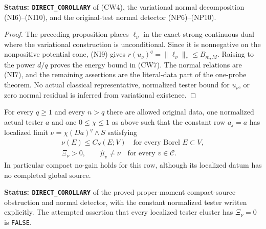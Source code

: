 \noindent\textbf{Status: \texttt{DIRECT\_COROLLARY}} of
(CW4), the variational normal decomposition (NI6)--(NI10),
and the original-test normal detector (NP6)--(NP10).

\begin{proof}
The preceding proposition places $\ell_\nu$ in the exact
strong-continuous dual where the variational construction is
unconditional. Since it is nonnegative on the nonpositive
potential cone, (NI9) gives
$r(u_\nu)^q=\|\ell_\nu\|_*\leq B_{m,M}$.
Raising to the power $d/q$ proves the energy bound in (CW7).
The normal relations are (NI7), and the remaining assertions
are the literal-data part of the one-probe theorem. No actual
classical representative, normalized tester bound for $u_\nu$,
or zero normal residual is inferred from variational existence.
\end{proof}

\begin{proposition}
\label{prop:r12-localized-normal-defect-not-capacity-gate}
For every $q\geq1$ and every $n>q$ there are allowed original
data, one normalized actual tester $a$ and one $0\leq\chi\leq1$
as above such that the constant row $a_j=a$ has localized limit
$\nu=\chi(Da)^q\wedge S$ satisfying
\[
 \begin{gathered}
       \nu(E)\leq C_S(E;V)\quad\text{for every Borel }E\subset V,\\
       \Xi_\nu>0,
       \qquad \widehat\mu_v\ne\nu\quad\text{for every }v\in\mathscr C.
 \end{gathered}
 \tag{CW10}
\]
In particular compact no-gain holds for this row, although its
localized datum has no completed global source.
\end{proposition}

\noindent\textbf{Status: \texttt{DIRECT\_COROLLARY}}
of the proved proper-moment compact-source obstruction and
normal detector, with the constant normalized tester written
explicitly. The attempted assertion that every localized tester
cluster has $\Xi_\nu=0$ is \texttt{FALSE}.

